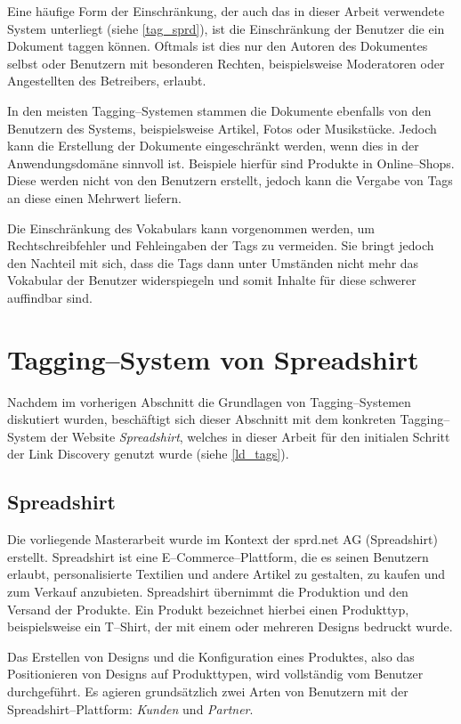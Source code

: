 Eine häufige Form der Einschränkung, der auch das in dieser Arbeit verwendete System unterliegt (siehe \cref{tag_sprd}), ist die Einschränkung der Benutzer die ein Dokument taggen können. Oftmals ist dies nur den Autoren des Dokumentes selbst oder Benutzern mit besonderen Rechten, beispielsweise Moderatoren oder Angestellten des Betreibers, erlaubt.

In den meisten Tagging--Systemen stammen die Dokumente ebenfalls von den Benutzern des Systems, beispielsweise Artikel, Fotos oder Musikstücke. Jedoch kann die Erstellung der Dokumente eingeschränkt werden, wenn dies in der Anwendungsdomäne sinnvoll ist. Beispiele hierfür sind Produkte in Online--Shops. Diese werden nicht von den Benutzern erstellt, jedoch kann die Vergabe von Tags an diese einen Mehrwert liefern.

Die Einschränkung des Vokabulars kann vorgenommen werden, um Rechtschreibfehler und Fehleingaben der Tags zu vermeiden. Sie bringt jedoch den Nachteil mit sich, dass die Tags dann unter Umständen nicht mehr das Vokabular der Benutzer widerspiegeln und somit Inhalte für diese schwerer auffindbar sind.

\section{Tagging--System von Spreadshirt}

Nachdem im vorherigen Abschnitt die Grundlagen von Tagging--Systemen diskutiert wurden, beschäftigt sich dieser Abschnitt mit dem konkreten Tagging--System der Website \emph{Spreadshirt}, welches in dieser Arbeit für den initialen Schritt der Link Discovery genutzt wurde (siehe \cref{ld_tags}).

\subsection{Spreadshirt}
\label{spreadshirt}

Die vorliegende Masterarbeit wurde im Kontext der sprd.net AG (Spreadshirt) \cite{sprd2013} erstellt. Spreadshirt ist eine E--Commerce--Plattform, die es seinen Benutzern erlaubt, personalisierte Textilien und andere Artikel zu gestalten, zu kaufen und zum Verkauf anzubieten. Spreadshirt übernimmt die Produktion und den Versand der Produkte. Ein Produkt bezeichnet hierbei einen Produkttyp, beispielsweise ein T--Shirt, der mit einem oder mehreren Designs bedruckt wurde.

Das Erstellen von Designs und die Konfiguration eines Produktes, also das Positionieren von Designs auf Produkttypen, wird vollständig vom Benutzer durchgeführt. Es agieren grundsätzlich zwei Arten von Benutzern mit der Spreadshirt--Plattform: \emph{Kunden} und \emph{Partner}.

